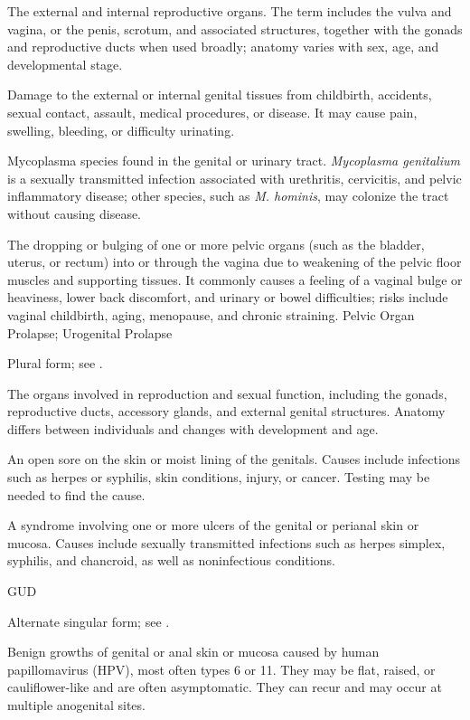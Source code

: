  The external and internal reproductive organs. The term includes the vulva and vagina,
or the penis, scrotum, and associated structures, together with the gonads and
reproductive ducts when used broadly; anatomy varies with sex, age, and developmental
stage.

 Damage to the external or internal genital tissues from childbirth, accidents, sexual contact, assault, medical procedures, or disease. It may cause pain, swelling, bleeding, or difficulty urinating.

 Mycoplasma species found in the genital or urinary tract. \textit{Mycoplasma genitalium} is a sexually transmitted infection associated with urethritis, cervicitis, and pelvic inflammatory disease; other species, such as \textit{M. hominis}, may colonize the tract without causing disease.

 The dropping or bulging of one or more pelvic organs (such as the bladder, uterus, or rectum) into or through the vagina due to weakening of the pelvic floor muscles and supporting tissues. It commonly causes a feeling of a vaginal bulge or heaviness, lower back discomfort, and urinary or bowel difficulties; risks include vaginal childbirth, aging, menopause, and chronic straining.
\synonyms
Pelvic Organ Prolapse; Urogenital Prolapse

 Plural form; see .

 The organs involved in reproduction and sexual function, including the gonads, reproductive ducts, accessory glands, and external genital structures. Anatomy differs between individuals and changes with development and age.

 An open sore on the skin or moist lining of the genitals. Causes include infections such as herpes or syphilis, skin conditions, injury, or cancer. Testing may be needed to find the cause.

 A syndrome involving one or more ulcers of the genital or perianal skin or mucosa. Causes include sexually transmitted infections such as herpes simplex, syphilis, and chancroid, as well as noninfectious conditions.

\synonyms
GUD

 Alternate singular form; see .

 Benign growths of genital or anal skin or mucosa caused by human papillomavirus (HPV), most often types 6 or 11. They may be flat, raised, or cauliflower-like and are often asymptomatic. They can recur and may occur at multiple anogenital sites.

